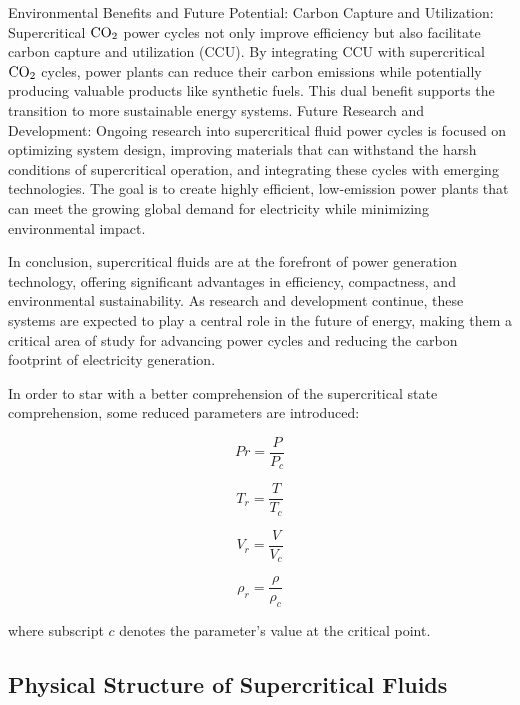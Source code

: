     Environmental Benefits and Future Potential: Carbon Capture and Utilization:
        Supercritical $\ce{CO2}$ power cycles not only improve efficiency but also
        facilitate carbon capture and utilization (CCU). By integrating CCU with
        supercritical $\ce{CO2}$ cycles, power plants can reduce their carbon emissions
        while potentially producing valuable products like synthetic fuels. This
        dual benefit supports the transition to more sustainable energy systems.
        Future Research and Development: Ongoing research into supercritical
        fluid power cycles is focused on optimizing system design, improving
        materials that can withstand the harsh conditions of supercritical
        operation, and integrating these cycles with emerging technologies. The
        goal is to create highly efficient, low-emission power plants that can
        meet the growing global demand for electricity while minimizing
        environmental impact.

In conclusion, supercritical fluids are at the forefront of power generation
technology, offering significant advantages in efficiency, compactness, and
environmental sustainability. As research and development continue, these
systems are expected to play a central role in the future of energy, making them
a critical area of study for advancing power cycles and reducing the carbon
footprint of electricity generation.

In order to star with a better comprehension of the supercritical state
comprehension, some reduced parameters are introduced:

\begin{equation}
	Pr = \frac{P}{P_c}
\end{equation}

\begin{equation}
	T_r = \frac{T}{T_c}
\end{equation}

\begin{equation}
	V_r = \frac{V}{V_c}
\end{equation}

\begin{equation}
	\rho_r = \frac{\rho}{\rho_c}
\end{equation}

where subscript $c$ denotes the parameter's value at the critical point.

	\subsection{Physical Structure of Supercritical Fluids}

